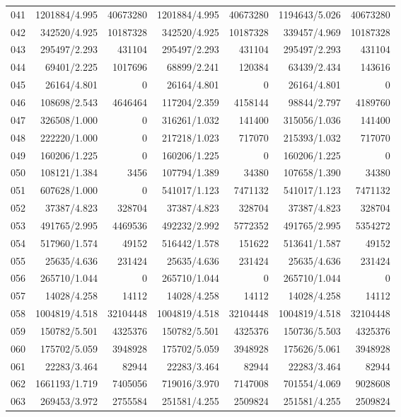 \begin{longtable}{crrrrrr}
041 & 1201884/4.995 & 40673280 & 1201884/4.995 & 40673280 & 1194643/5.026 & 40673280 \\
042 & 342520/4.925 & 10187328 & 342520/4.925 & 10187328 & 339457/4.969 & 10187328 \\
043 & 295497/2.293 & 431104 & 295497/2.293 & 431104 & 295497/2.293 & 431104 \\
044 & 69401/2.225 & 1017696 & 68899/2.241 & 120384 & 63439/2.434 & 143616 \\
045 & 26164/4.801 & 0 & 26164/4.801 & 0 & 26164/4.801 & 0 \\
046 & 108698/2.543 & 4646464 & 117204/2.359 & 4158144 & 98844/2.797 & 4189760 \\
047 & 326508/1.000 & 0 & 316261/1.032 & 141400 & 315056/1.036 & 141400 \\
048 & 222220/1.000 & 0 & 217218/1.023 & 717070 & 215393/1.032 & 717070 \\
049 & 160206/1.225 & 0 & 160206/1.225 & 0 & 160206/1.225 & 0 \\
050 & 108121/1.384 & 3456 & 107794/1.389 & 34380 & 107658/1.390 & 34380 \\
051 & 607628/1.000 & 0 & 541017/1.123 & 7471132 & 541017/1.123 & 7471132 \\
052 & 37387/4.823 & 328704 & 37387/4.823 & 328704 & 37387/4.823 & 328704 \\
053 & 491765/2.995 & 4469536 & 492232/2.992 & 5772352 & 491765/2.995 & 5354272 \\
054 & 517960/1.574 & 49152 & 516442/1.578 & 151622 & 513641/1.587 & 49152 \\
055 & 25635/4.636 & 231424 & 25635/4.636 & 231424 & 25635/4.636 & 231424 \\
056 & 265710/1.044 & 0 & 265710/1.044 & 0 & 265710/1.044 & 0 \\
057 & 14028/4.258 & 14112 & 14028/4.258 & 14112 & 14028/4.258 & 14112 \\
058 & 1004819/4.518 & 32104448 & 1004819/4.518 & 32104448 & 1004819/4.518 & 32104448 \\
059 & 150782/5.501 & 4325376 & 150782/5.501 & 4325376 & 150736/5.503 & 4325376 \\
060 & 175702/5.059 & 3948928 & 175702/5.059 & 3948928 & 175626/5.061 & 3948928 \\
061 & 22283/3.464 & 82944 & 22283/3.464 & 82944 & 22283/3.464 & 82944 \\
062 & 1661193/1.719 & 7405056 & 719016/3.970 & 7147008 & 701554/4.069 & 9028608 \\
063 & 269453/3.972 & 2755584 & 251581/4.255 & 2509824 & 251581/4.255 & 2509824 \\

\end{longtable}
